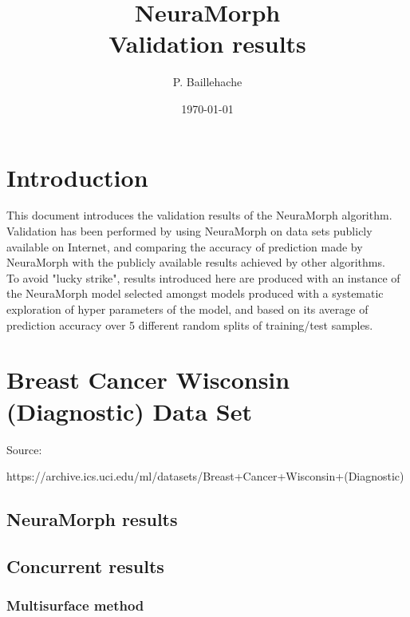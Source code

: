 \documentclass[8pt, a4paper]{article}
\begin{document}
\title{NeuraMorph\\Validation results}
\author{P. Baillehache}
\date{\today}
\maketitle

\tableofcontents

\section*{Introduction}

This document introduces the validation results of the NeuraMorph algorithm.\\

Validation has been performed by using NeuraMorph on data sets publicly available on Internet, and comparing the accuracy of prediction made by NeuraMorph with the publicly available results achieved by other algorithms.\\

To avoid "lucky strike", results introduced here are produced with an instance of the NeuraMorph model selected amongst models produced with a systematic exploration of hyper parameters of the model, and based on its average of prediction accuracy over 5 different random splits of training/test samples.\\

\newpage
\section{Breast Cancer Wisconsin (Diagnostic) Data Set}

Source: 

https://archive.ics.uci.edu/ml/datasets/Breast+Cancer+Wisconsin+(Diagnostic)

\subsection{NeuraMorph results}



\subsection{Concurrent results}

\subsubsection{Multisurface method}
\end{document}
